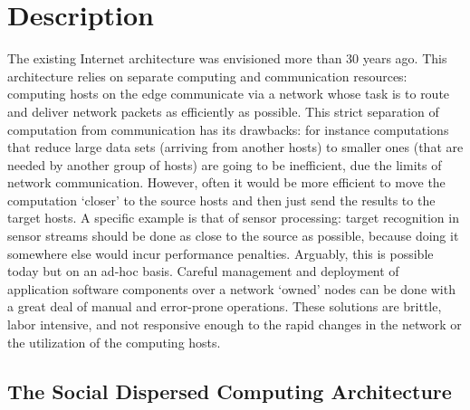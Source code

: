 \documentclass[12pt,letterpaper]{article}
\begin{document}
\clearpage
\section{Description}
The existing Internet architecture was envisioned more than 30 years ago. This architecture relies on separate computing and communication resources: computing hosts on the edge communicate via a network whose task is to route and deliver network packets as efficiently as possible. This strict separation of computation from communication has its drawbacks: for instance computations that reduce large data sets (arriving from another hosts) to smaller ones (that are needed by another group of hosts) are going to be inefficient, due the limits of network communication. However, often it would be more efficient to move the computation `closer' to the source hosts and then just send the results to the target hosts. A specific example is that of sensor processing: target recognition in sensor streams should be done as close to the source as possible, because doing it somewhere else would incur performance penalties.  Arguably, this is possible today but on an ad-hoc basis. Careful management and deployment of application software components over a network `owned' nodes can be done with a great deal of manual and error-prone operations. These solutions are brittle, labor intensive, and not responsive enough to the rapid changes in the network or the utilization of the computing hosts. 

\subsection{The Social Dispersed Computing Architecture}
\end{document}
